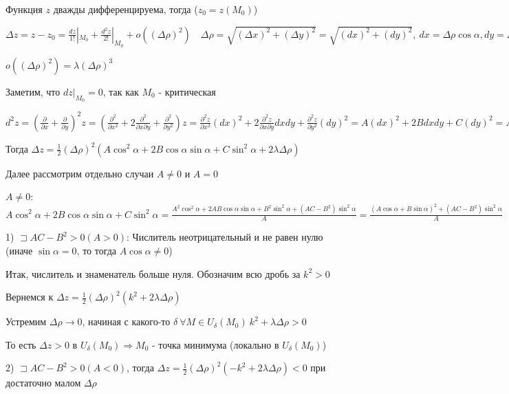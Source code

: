 \documentclass[12pt]{article}
\begin{document}
    Функция $z$ дважды дифференцируема, тогда ($z_0 = z(M_0)$)

    $\Delta z = z - z_0 = \frac{dz}{1!} |_{M_0} + \frac{d^2 z}{2!} |_{M_0} + o((\Delta \rho)^2) \quad \Delta \rho = \sqrt{(\Delta x)^2 + (\Delta y)^2} = \sqrt{(dx)^2 + (dy)^2}, \ dx = \Delta\rho \cos\alpha, dy = \Delta\rho \sin\alpha$

    $o((\Delta \rho)^2) = \lambda (\Delta \rho)^3$

    Заметим, что $dz |_{M_0} = 0$, так как $M_0$ - критическая

    $d^2 z = \left(\frac{\partial}{\partial x} + \frac{\partial}{\partial y}\right)^2 z = \left(\frac{\partial^2}{\partial x^2} + 2 \frac{\partial^2}{\partial x \partial y} + \frac{\partial^2}{\partial y^2}\right) z =
    \frac{\partial^2 z}{\partial x^2} (dx)^2 + 2 \frac{\partial^2 z}{\partial x \partial y} dxdy + \frac{\partial^2 z}{\partial y^2} (dy)^2 = A (dx)^2 + 2B dxdy + C(dy)^2 =
    A(\Delta \rho)^2 \cos^2\alpha + 2B (\Delta \rho)^2 \cos\alpha\sin\alpha + C(\Delta \rho)^2 \sin^2\alpha$

    Тогда $\Delta z = \frac{1}{2} (\Delta \rho)^2 (A\cos^2\alpha + 2B\cos\alpha\sin\alpha + C\sin^2\alpha + 2\lambda \Delta \rho)$

    Далее рассмотрим отдельно случаи $A \neq 0$ и $A = 0$

    $A \neq 0$: $A\cos^2\alpha + 2B\cos\alpha\sin\alpha + C\sin^2\alpha = \frac{A^2\cos^2\alpha + 2AB\cos\alpha\sin\alpha + B^2\sin^2\alpha + (AC - B^2)\sin^2\alpha}{A} =
    \frac{(A\cos\alpha + B\sin\alpha)^2 + (AC - B^2)\sin^2\alpha}{A}$

    1) $\sqsupset AC - B^2 > 0 (A > 0)$: Числитель неотрицательный и не равен нулю (иначе $\sin\alpha = 0$, то тогда $A\cos\alpha \neq 0$)

    Итак, числитель и знаменатель больше нуля. Обозначим всю дробь за $k^2 > 0$

    Вернемся к $\Delta z = \frac{1}{2}(\Delta \rho)^2 (k^2 + 2\lambda\Delta\rho)$

    Устремим $\Delta \rho \rightarrow 0$, начиная с какого-то $\delta \ \forall M \in U_\delta(M_0) \ k^2 + \lambda\Delta\rho > 0$

    То есть $\Delta z > 0$ в $U_\delta(M_0) \Longrightarrow M_0$ - точка минимума (локально в $U_\delta(M_0)$)

    2) $\sqsupset AC - B^2 > 0 (A < 0)$, тогда $\Delta z = \frac{1}{2}(\Delta \rho)^2 (-k^2 + 2\lambda\Delta\rho) < 0$ при достаточно малом $\Delta \rho$
\end{document}
